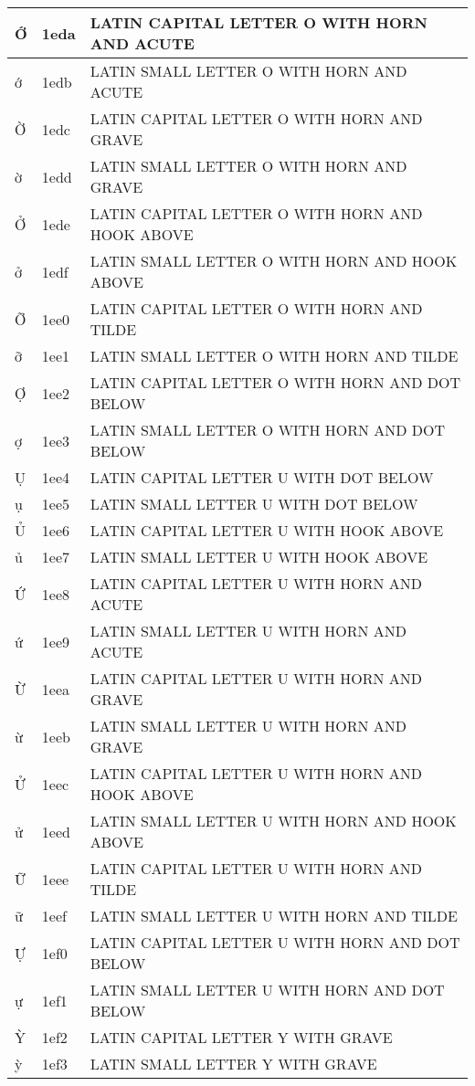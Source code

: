 \documentclass[12pt,letterpaper,openany]{book}
\begin{document}
\begin{center}
\begin{supertabular}{|m{0.25in}|m{0.5in}|m{4in}|}
Ớ & 1eda & LATIN CAPITAL LETTER O WITH HORN AND ACUTE\\\hline
ớ & 1edb & LATIN SMALL LETTER O WITH HORN AND ACUTE\\\hline
Ờ & 1edc & LATIN CAPITAL LETTER O WITH HORN AND GRAVE\\\hline
ờ & 1edd & LATIN SMALL LETTER O WITH HORN AND GRAVE\\\hline
Ở & 1ede & LATIN CAPITAL LETTER O WITH HORN AND HOOK ABOVE\\\hline
ở & 1edf & LATIN SMALL LETTER O WITH HORN AND HOOK ABOVE\\\hline
Ỡ & 1ee0 & LATIN CAPITAL LETTER O WITH HORN AND TILDE\\\hline
ỡ & 1ee1 & LATIN SMALL LETTER O WITH HORN AND TILDE\\\hline
Ợ & 1ee2 & LATIN CAPITAL LETTER O WITH HORN AND DOT BELOW\\\hline
ợ & 1ee3 & LATIN SMALL LETTER O WITH HORN AND DOT BELOW\\\hline
Ụ & 1ee4 & LATIN CAPITAL LETTER U WITH DOT BELOW\\\hline
ụ & 1ee5 & LATIN SMALL LETTER U WITH DOT BELOW\\\hline
Ủ & 1ee6 & LATIN CAPITAL LETTER U WITH HOOK ABOVE\\\hline
ủ & 1ee7 & LATIN SMALL LETTER U WITH HOOK ABOVE\\\hline
Ứ & 1ee8 & LATIN CAPITAL LETTER U WITH HORN AND ACUTE\\\hline
ứ & 1ee9 & LATIN SMALL LETTER U WITH HORN AND ACUTE\\\hline
Ừ & 1eea & LATIN CAPITAL LETTER U WITH HORN AND GRAVE\\\hline
ừ & 1eeb & LATIN SMALL LETTER U WITH HORN AND GRAVE\\\hline
Ử & 1eec & LATIN CAPITAL LETTER U WITH HORN AND HOOK ABOVE\\\hline
ử & 1eed & LATIN SMALL LETTER U WITH HORN AND HOOK ABOVE\\\hline
Ữ & 1eee & LATIN CAPITAL LETTER U WITH HORN AND TILDE\\\hline
ữ & 1eef & LATIN SMALL LETTER U WITH HORN AND TILDE\\\hline
Ự & 1ef0 & LATIN CAPITAL LETTER U WITH HORN AND DOT BELOW\\\hline
ự & 1ef1 & LATIN SMALL LETTER U WITH HORN AND DOT BELOW\\\hline
Ỳ & 1ef2 & LATIN CAPITAL LETTER Y WITH GRAVE\\\hline
ỳ & 1ef3 & LATIN SMALL LETTER Y WITH GRAVE\\\hline

\end{supertabular}
\end{center}
\end{document}
